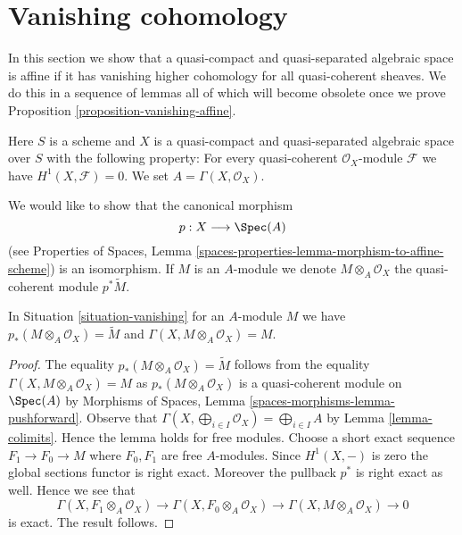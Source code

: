 \section{Vanishing cohomology}
\label{section-vanishing}

\noindent
In this section we show that a quasi-compact and quasi-separated
algebraic space is affine if it has vanishing higher cohomology
for all quasi-coherent sheaves. We do this in a sequence of lemmas
all of which will become obsolete once we prove
Proposition \ref{proposition-vanishing-affine}.

\begin{situation}
\label{situation-vanishing}
Here $S$ is a scheme and $X$ is a quasi-compact and quasi-separated
algebraic space over $S$ with the following property: For every
quasi-coherent $\mathcal{O}_X$-module $\mathcal{F}$ we have
$H^1(X, \mathcal{F}) = 0$. We set $A = \Gamma(X, \mathcal{O}_X)$.
\end{situation}

\noindent
We would like to show that the canonical morphism
$$
p : X \longrightarrow \Spec(A)
$$
(see Properties of Spaces, Lemma
\ref{spaces-properties-lemma-morphism-to-affine-scheme}) is an isomorphism.
If $M$ is an $A$-module we denote $M \otimes_A \mathcal{O}_X$
the quasi-coherent module $p^*\tilde M$.

\begin{lemma}
\label{lemma-vanishing-compute}
In Situation \ref{situation-vanishing} for an $A$-module $M$ we have
$p_*(M \otimes_A \mathcal{O}_X) = \widetilde{M}$ and
$\Gamma(X, M \otimes_A \mathcal{O}_X) = M$.
\end{lemma}

\begin{proof}
The equality $p_*(M \otimes_A \mathcal{O}_X) = \widetilde{M}$ follows
from the equality $\Gamma(X, M \otimes_A \mathcal{O}_X) = M$ as
$p_*(M \otimes_A \mathcal{O}_X)$ is a quasi-coherent module on
$\Spec(A)$ by Morphisms of Spaces, Lemma
\ref{spaces-morphisms-lemma-pushforward}.
Observe that $\Gamma(X, \bigoplus_{i \in I} \mathcal{O}_X) =
\bigoplus_{i \in I} A$ by Lemma \ref{lemma-colimits}. Hence the
lemma holds for free modules. Choose a short exact sequence
$F_1 \to F_0 \to M$ where $F_0, F_1$ are free $A$-modules. Since
$H^1(X, -)$ is zero the global sections functor is right exact.
Moreover the pullback $p^*$ is right exact as well. Hence we see
that
$$
\Gamma(X, F_1 \otimes_A \mathcal{O}_X) \to
\Gamma(X, F_0 \otimes_A \mathcal{O}_X) \to
\Gamma(X, M \otimes_A \mathcal{O}_X) \to 0
$$
is exact. The result follows.
\end{proof}

